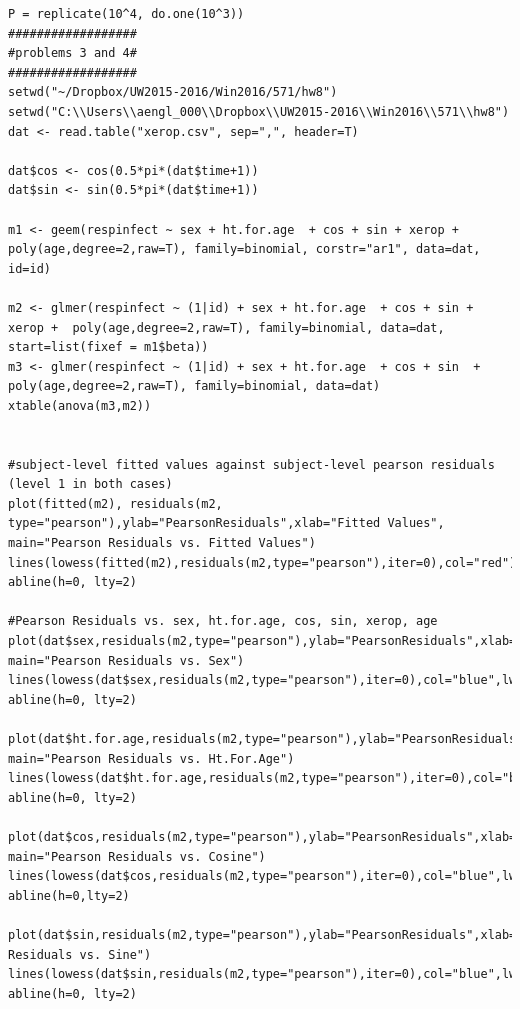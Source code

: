 \documentclass[11pt]{article}
\begin{document}
\begin{verbatim}
P = replicate(10^4, do.one(10^3))
##################
#problems 3 and 4#
##################
setwd("~/Dropbox/UW2015-2016/Win2016/571/hw8")
setwd("C:\\Users\\aengl_000\\Dropbox\\UW2015-2016\\Win2016\\571\\hw8")
dat <- read.table("xerop.csv", sep=",", header=T)

dat$cos <- cos(0.5*pi*(dat$time+1))
dat$sin <- sin(0.5*pi*(dat$time+1))

m1 <- geem(respinfect ~ sex + ht.for.age  + cos + sin + xerop + poly(age,degree=2,raw=T), family=binomial, corstr="ar1", data=dat, id=id)

m2 <- glmer(respinfect ~ (1|id) + sex + ht.for.age  + cos + sin + xerop +  poly(age,degree=2,raw=T), family=binomial, data=dat, start=list(fixef = m1$beta))
m3 <- glmer(respinfect ~ (1|id) + sex + ht.for.age  + cos + sin  +  poly(age,degree=2,raw=T), family=binomial, data=dat)
xtable(anova(m3,m2))


#subject-level fitted values against subject-level pearson residuals (level 1 in both cases)
plot(fitted(m2), residuals(m2, type="pearson"),ylab="PearsonResiduals",xlab="Fitted Values", main="Pearson Residuals vs. Fitted Values")
lines(lowess(fitted(m2),residuals(m2,type="pearson"),iter=0),col="red")
abline(h=0, lty=2)

#Pearson Residuals vs. sex, ht.for.age, cos, sin, xerop, age
plot(dat$sex,residuals(m2,type="pearson"),ylab="PearsonResiduals",xlab="sex", main="Pearson Residuals vs. Sex")
lines(lowess(dat$sex,residuals(m2,type="pearson"),iter=0),col="blue",lwd=2)
abline(h=0, lty=2)

plot(dat$ht.for.age,residuals(m2,type="pearson"),ylab="PearsonResiduals",xlab="ht.for.age", main="Pearson Residuals vs. Ht.For.Age")
lines(lowess(dat$ht.for.age,residuals(m2,type="pearson"),iter=0),col="blue",lwd=2)
abline(h=0, lty=2)

plot(dat$cos,residuals(m2,type="pearson"),ylab="PearsonResiduals",xlab="cos", main="Pearson Residuals vs. Cosine")
lines(lowess(dat$cos,residuals(m2,type="pearson"),iter=0),col="blue",lwd=2)
abline(h=0,lty=2)

plot(dat$sin,residuals(m2,type="pearson"),ylab="PearsonResiduals",xlab="sin",main="Pearson Residuals vs. Sine")
lines(lowess(dat$sin,residuals(m2,type="pearson"),iter=0),col="blue",lwd=2)
abline(h=0, lty=2)


\end{verbatim}
\end{document}
